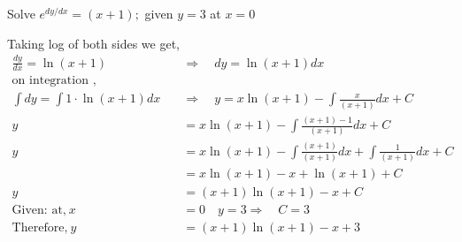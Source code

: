 \begin{exercise}
	Solve $e^{d y / d x}=(x+1) ;$ given $y=3$ at $x=0$
\end{exercise}
\begin{answer}
	Taking log of both sides we get, 
	\begin{align*}
		\frac{d y}{d x}=\ln (x+1)\quad &\Rightarrow \quad d y=\ln (x+1) d x\\\text{on integration }, \\\int d y=\int 1 \cdot \ln (x+1) d x \quad &\Rightarrow \quad y=x \ln (x+1)-\int \frac{x}{(x+1)} d x+C\\
		y&=x \ln (x+1)-\int \frac{(x+1)-1}{(x+1)} d x+C\\ y&=x \ln (x+1)-\int \frac{(x+1)}{(x+1)} d x+\int \frac{1}{(x+1)} d x+C\\&=x \ln (x+1)-x+\ln (x+1)+C\\y&=(x+1) \ln (x+1)-x+C\\\text{Given: at,}\ x&=0 \quad y=3 \Rightarrow \quad C=3\\
		\text{Therefore,}\ y&=(x+1) \ln (x+1)-x+3
	\end{align*}
	
\end{answer}
